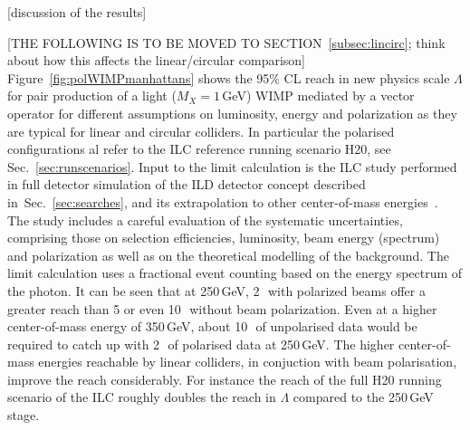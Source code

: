 [discussion of the results]


{\color{red}[THE FOLLOWING IS TO BE MOVED TO
  SECTION~\ref{subsec:lincirc}; think about how this affects the
  linear/circular comparison]}\\
Figure~\ref{fig:polWIMPmanhattans} shows the 95\% CL reach in new physics scale $\Lambda$ for pair production of a light ($M_{X} = 1$\,GeV) WIMP mediated by a vector operator for different assumptions on luminosity, energy and polarization 
as they are typical for linear and circular colliders. In particular the polarised
configurations al refer to the ILC reference running scenario H20, see Sec.~\ref{sec:runscenarios}. Input to the limit calculation is the ILC study performed in full detector simulation of the ILD detector concept described in~Sec.~\ref{sec:searches}, and its extrapolation to other center-of-mass energies~\cite{Habermehl:417605}. The study includes a careful evaluation of the systematic uncertainties, comprising those on selection efficiencies, luminosity, beam energy (spectrum) and polarization as well as on the theoretical modelling of the background. The limit calculation uses a fractional event counting based on the 
energy spectrum of the photon. It can be seen that at 250\,GeV, 2\,\iab\ with polarized beams offer a greater reach than 5 or even 10\,\iab\ without beam polarization. Even at a higher center-of-mass energy of 350\,GeV, about 10\,\iab\ of unpolarised data  would be required to catch up with 2\,\iab\ of polarised data at 250\,GeV. The higher center-of-mass energies reachable by linear colliders, in conjuction with beam polarisation, improve the reach considerably. For instance the reach of the full H20 running scenario of the ILC roughly doubles the reach in $\Lambda$ compared to the 250\,GeV stage.

